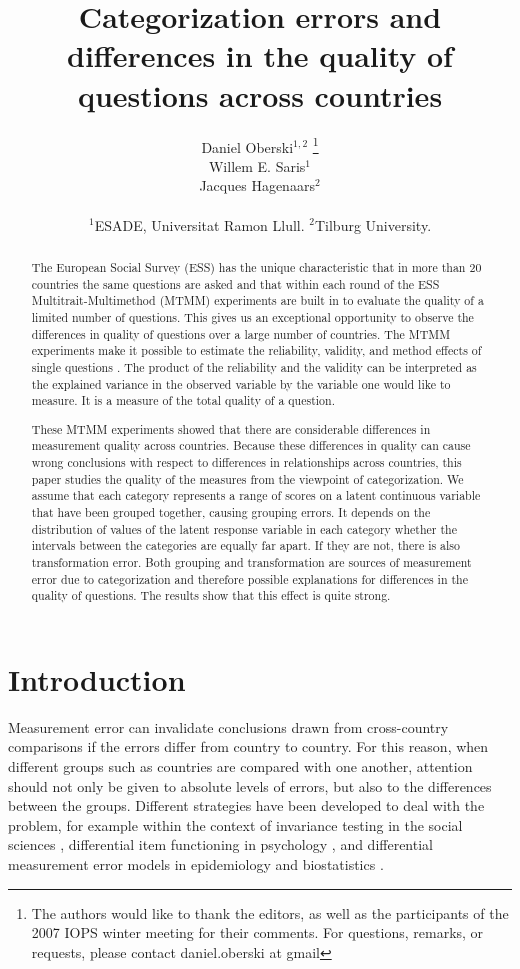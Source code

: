 \documentclass[a4paper,12pt]{article}
\author{Daniel Oberski$^{1, 2}$  \thanks{The authors would like to thank the editors, as well as the participants of the 2007 IOPS winter meeting for their comments. For questions, remarks, or requests, please contact daniel.oberski at gmail}\\Willem E. Saris$^{1}$\\
Jacques Hagenaars$^{2}$\\\\
 $^{1}$ESADE, Universitat Ramon Llull. $^{2}$Tilburg University.}
\title{Categorization errors and differences in the quality of questions across countries}
\begin{document}
\maketitle
\begin{abstract}
The European Social Survey (ESS) has the unique characteristic that in more than 20 countries the same questions are asked and that within each round of the ESS Multitrait-Multimethod (MTMM) experiments are built in to evaluate the quality of a limited number of questions. This gives us an exceptional opportunity to observe the differences in quality of questions over a large number of countries. The MTMM experiments make it possible to estimate the reliability, validity, and method effects of single questions \citep{andrews_construct_1984,saris_new_2004,saris_evaluation_1991}. The product of the reliability and the validity can be interpreted as the explained variance in the observed variable by the variable one would like to measure. It is a measure of the total quality of a question.

These MTMM experiments showed that there are considerable differences in measurement quality across countries. Because these differences in quality can cause wrong conclusions with respect to differences in relationships across countries,  this paper studies the quality of the measures from the viewpoint of categorization. We assume that each category represents a range of scores on a latent continuous variable that have been grouped together, causing grouping errors. It depends on the distribution of values of the latent response variable in each category whether the intervals between the categories are equally far apart. If they are not, there is also transformation error. Both grouping and transformation are sources of measurement error due to categorization and therefore possible explanations for differences in the quality of questions. The results show that this effect is quite strong.
\end{abstract}\newpage

\section*{Introduction}

Measurement error can invalidate conclusions drawn from cross-country comparisons if the errors differ from country to country. For this reason, when different groups such as countries are compared with one another, attention should not only be given to absolute levels of errors, but also to the differences between the groups. Different strategies have been developed to deal with the problem, for example within the context of invariance testing in the social sciences \citep{joreskog_simultaneous_1971}, differential item functioning in psychology \citep{muthen_multiple_1985}, and differential measurement error models in epidemiology and biostatistics \citep{carroll_nonlinear_1995}.
\end{document}
